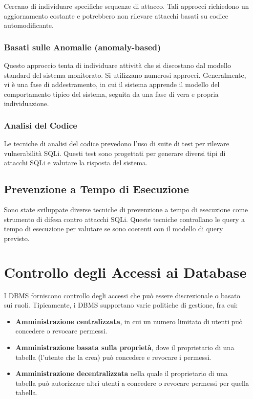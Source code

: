 Cercano di individuare specifiche sequenze di attacco. Tali approcci richiedono un aggiornamento costante e potrebbero non rilevare attacchi basati su codice automodificante.

\subsubsection{Basati sulle Anomalie (anomaly-based)}

Questo approccio tenta di individuare attività che si discostano dal modello standard del sistema monitorato. Si utilizzano numerosi approcci. Generalmente, vi è una fase di addestramento, in cui il sistema apprende il modello del comportamento tipico del sistema, seguita da una fase di vera e propria individuazione.

\subsubsection{Analisi del Codice}

Le tecniche di analisi del codice prevedono l'uso di suite di test per rilevare vulnerabilità SQLi. Questi test sono progettati per generare diversi tipi di attacchi SQLi e valutare la risposta del sistema.

\subsection{Prevenzione a Tempo di Esecuzione}

Sono state sviluppate diverse tecniche di prevenzione a tempo di esecuzione come strumento di difesa contro attacchi SQLi. Queste tecniche controllano le query a tempo di esecuzione per valutare se sono coerenti con il modello di query previsto.

\section{Controllo degli Accessi ai Database}

I DBMS forniscono controllo degli accessi che può essere discrezionale o basato sui ruoli. Tipicamente, i DBMS supportano varie politiche di gestione, fra cui:

\begin{itemize}
    \item \textbf{Amministrazione centralizzata}, in cui un numero limitato di utenti può concedere o revocare permessi.
    \item \textbf{Amministrazione basata sulla proprietà}, dove il proprietario di una tabella (l'utente che la crea) può concedere e revocare i permessi.
    \item \textbf{Amministrazione decentralizzata} nella quale il proprietario di una tabella può autorizzare altri utenti a concedere o revocare permessi per quella tabella.
\end{itemize}

